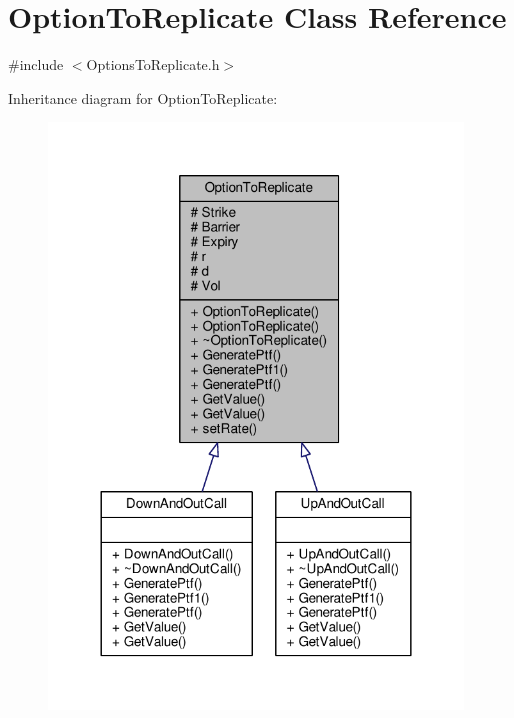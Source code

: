 \hypertarget{classOptionToReplicate}{}\section{Option\+To\+Replicate Class Reference}
\label{classOptionToReplicate}


{\ttfamily \#include $<$Options\+To\+Replicate.\+h$>$}



Inheritance diagram for Option\+To\+Replicate\+:
\nopagebreak
\begin{figure}[H]
\begin{center}
\leavevmode
\includegraphics[width=312pt]{classOptionToReplicate__inherit__graph}
\end{center}
\end{figure}


